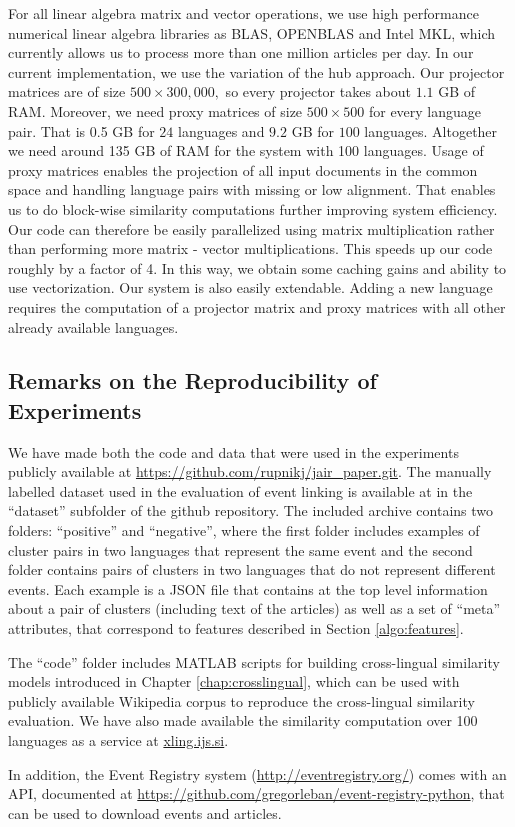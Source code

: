 For all linear algebra matrix and vector operations, we use high performance numerical
linear algebra libraries as BLAS, OPENBLAS and Intel MKL, which currently allows
us to process more than one million articles per day.
In our current implementation, we use the variation of the hub approach. Our projector
matrices are of size $500\times 300,000,$ so every projector takes about $1.1$ GB of RAM.
Moreover, we need proxy matrices of size $500\times500$ for every language pair. That
is 0.5 GB for $24$ languages and $9.2$ GB for $100$ languages. Altogether we need
around 135 GB of RAM for the system with 100 languages.
Usage of proxy matrices enables the projection of all input documents in the common
space and handling language pairs with missing or low alignment. That enables us to
do block-wise similarity computations further improving system efficiency. Our code
can therefore be easily parallelized using matrix multiplication rather than performing
more matrix - vector multiplications. This speeds up our code roughly by a factor of 4. In
this way, we obtain some caching gains and ability to use vectorization.
Our system is also easily extendable. Adding a new language requires the computation of
a projector matrix and proxy matrices with all other already available languages. 

\subsection{Remarks on the Reproducibility of Experiments}
We have made  both the code and data that were used in the experiments publicly available at \url{https://github.com/rupnikj/jair_paper.git}.
The manually labelled dataset used in the evaluation of event linking is available at in the ``dataset'' subfolder of the github repository. The included archive contains two folders: ``positive'' and ``negative'', where the first folder includes examples of cluster pairs in two languages that represent the same event and the second folder contains pairs of clusters in two languages that do not represent different events. Each example is a JSON file that contains at the top level information about a pair of clusters (including text of the articles) as well as a set of ``meta'' attributes, that correspond to features described in Section \ref{algo:features}.

The ``code'' folder includes MATLAB scripts for building cross-lingual similarity models introduced in Chapter \ref{chap:crosslingual}, which can be used with publicly available Wikipedia corpus to reproduce the cross-lingual similarity evaluation. We have also made available the similarity computation over 100 languages as a service at \url{xling.ijs.si}.

In addition, the Event Registry system (\url{http://eventregistry.org/}) comes with an API, documented at \url{https://github.com/gregorleban/event-registry-python}, that can be used to download events and articles. 

